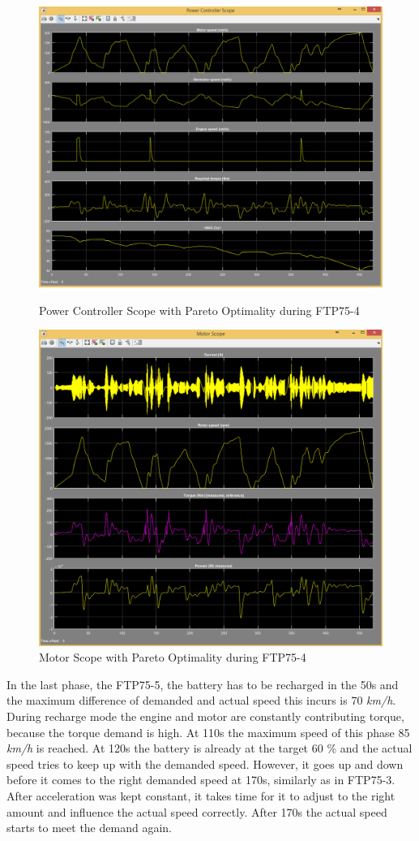 \begin{figure}[hp]
\centering
\includegraphics[scale=0.4]{figures/Pareto/FTP75-4/powerController05Juli}
\caption{Power Controller Scope with Pareto Optimality during FTP75-4}
\label{fig:pcpo4}
\includegraphics[scale=0.37]{figures/Pareto/FTP75-4/motor05Juli}
\caption{Motor Scope with Pareto Optimality during FTP75-4}
\label{fig:mpo4}
\end{figure}

In the last phase, the FTP75-5, the battery has to be recharged in the 50s and the maximum difference of demanded and actual speed this incurs is 70 \textit{km/h}. During recharge mode the engine and motor are constantly contributing torque, because the torque demand is high. At 110s the maximum speed of this phase 85 \textit{km/h} is reached. At 120s the battery is already at the target 60 \% and the actual speed tries to keep up with the demanded speed. However, it goes up and down before it comes to the right demanded speed at 170s, similarly as in FTP75-3. After acceleration was kept constant, it takes time for it to adjust to the right amount and influence the actual speed correctly. After 170s the actual speed starts to meet the demand again. 

